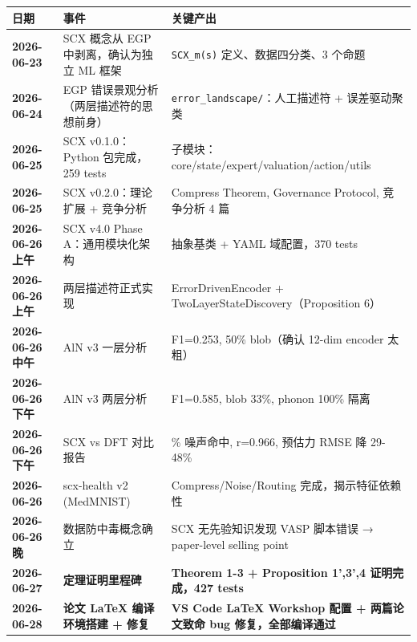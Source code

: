 \documentclass[
  12pt,
]{ctexart}
\begin{document}
\begin{longtable}[]{@{}
  >{\raggedright\arraybackslash}p{}
  >{\raggedright\arraybackslash}p{}
  >{\raggedright\arraybackslash}p{}@{}}
\toprule\noalign{}
\begin{minipage}[b]{\linewidth}\raggedright
日期
\end{minipage} & \begin{minipage}[b]{\linewidth}\raggedright
事件
\end{minipage} & \begin{minipage}[b]{\linewidth}\raggedright
关键产出
\end{minipage} \\
\midrule\noalign{}
\endhead
\bottomrule\noalign{}
\endlastfoot
\textbf{2026-06-23} & SCX 概念从 EGP 中剥离，确认为独立 ML 框架 &
\texttt{SCX\_m(s)} 定义、数据四分类、3 个命题 \\
\textbf{2026-06-24} & EGP 错误景观分析（两层描述符的思想前身） &
\texttt{error\_landscape/}：人工描述符 + 误差驱动聚类 \\
\textbf{2026-06-25} & SCX v0.1.0：Python 包完成，259 tests & 6
子模块：core/state/expert/valuation/action/utils \\
\textbf{2026-06-25} & SCX v0.2.0：理论扩展 + 竞争分析 & Compress
Theorem, Governance Protocol, 竞争分析 4 篇 \\
\textbf{2026-06-26 上午} & SCX v4.0 Phase A：通用模块化架构 & 抽象基类 +
YAML 域配置，370 tests \\
\textbf{2026-06-26 上午} & 两层描述符正式实现 & ErrorDrivenEncoder +
TwoLayerStateDiscovery（Proposition 6） \\
\textbf{2026-06-26 中午} & AlN v3 一层分析 & F1=0.253, 50\% blob（确认
12-dim encoder 太粗） \\
\textbf{2026-06-26 下午} & AlN v3 两层分析 & F1=0.585, blob 33\%, phonon
100\% 隔离 \\
\textbf{2026-06-26 下午} & SCX vs DFT 对比报告 & 100\% 噪声命中,
r=0.966, 预估力 RMSE 降 29-48\% \\
\textbf{2026-06-26} & scx-health v2 (MedMNIST) & Compress/Noise/Routing
完成，揭示特征依赖性 \\
\textbf{2026-06-26 晚} & 数据防中毒概念确立 & SCX 无先验知识发现 VASP
脚本错误 → paper-level selling point \\
\textbf{2026-06-27} & \textbf{定理证明里程碑} & \textbf{Theorem 1-3 +
Proposition 1',3',4 证明完成，427 tests} \\
\textbf{2026-06-28} & \textbf{论文 LaTeX 编译环境搭建 + 修复} &
\textbf{VS Code LaTeX Workshop 配置 + 两篇论文致命 bug
修复，全部编译通过} \\
\end{longtable}
\end{document}
